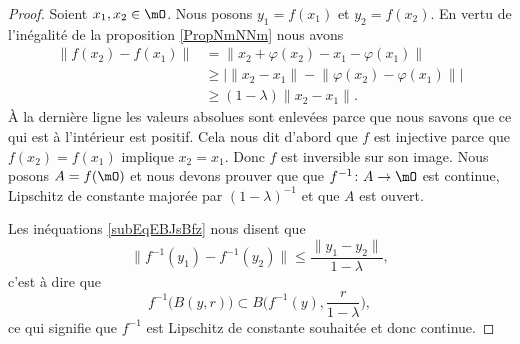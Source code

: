 \begin{proof}
        Soient \( x_1,x_2\in\mO\). Nous posons \( y_1=f(x_1)\) et \( y_2=f(x_2)\). En vertu de l'inégalité de la proposition \ref{PropNmNNm} nous avons
        \begin{subequations}    \label{subEqEBJsBfz}
            \begin{align}
            \big\| f(x_2)-f(x_1) \big\|&=\big\| x_2+\varphi(x_2)-x_1-\varphi(x_1) \big\|\\
        &\geq \Big|        \| x_2-x_1 \|-\big\| \varphi(x_2)-\varphi(x_1) \big\|  \Big|\\
    &\geq   (1-\lambda)\| x_2-x_1 \|.
            \end{align}
        \end{subequations}
        À la dernière ligne les valeurs absolues sont enlevées parce que nous savons que ce qui est à l'intérieur est positif. Cela nous dit d'abord que \( f\) est injective parce que \( f(x_2)=f(x_1)\) implique \( x_2=x_1\). Donc \( f\) est inversible sur son image. Nous posons \( A=f(\mO)\) et nous devons prouver que que \( f^{-1}\colon A\to \mO\) est continue, Lipschitz de constante majorée par \( (1-\lambda)^{-1}\) et que \( A\) est ouvert.

    Les inéquations \eqref{subEqEBJsBfz} nous disent que
    \begin{equation}
    \big\| f^{-1}(y_1)-f^{-1}(y_2) \big\|\leq \frac{ \| y_1-y_2 \| }{ 1-\lambda },
    \end{equation}
    c'est à dire que
    \begin{equation}
        f^{-1}\big( B(y,r) \big)\subset B\big( f^{-1}(y),\frac{ r }{ 1-\lambda } \big),
    \end{equation}
    ce qui signifie que \( f^{-1}\) est Lipschitz de constante souhaitée et donc continue.


\end{proof}
